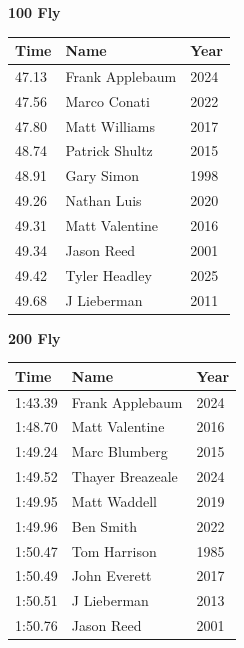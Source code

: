 \vspace{1.2em}
\noindent\begin{minipage}[t]{0.48\textwidth}
\centering
\textbf{\textcolor{teamprimary}{100 Fly}}\par
\vspace{0.5em}
\centering
\small
\renewcommand{\arraystretch}{1.0}
\setlength{\tabcolsep}{4pt}
\begin{tabular}{@{}p{1.8cm}p{3.0cm}p{1.0cm}@{}}
\toprule
\textbf{Time} & \textbf{Name} & \textbf{Year} \\
\midrule
47.13 & Frank Applebaum & 2024 \\
47.56 & Marco Conati & 2022 \\
47.80 & Matt Williams & 2017 \\
48.74 & Patrick Shultz & 2015 \\
48.91 & Gary Simon & 1998 \\
49.26 & Nathan Luis & 2020 \\
49.31 & Matt Valentine & 2016 \\
49.34 & Jason Reed & 2001 \\
49.42 & Tyler Headley & 2025 \\
49.68 & J Lieberman & 2011 \\
\bottomrule
\end{tabular}
\end{minipage}
\hfill
\begin{minipage}[t]{0.48\textwidth}
\centering
\textbf{\textcolor{teamprimary}{200 Fly}}\par
\vspace{0.5em}
\centering
\small
\renewcommand{\arraystretch}{1.0}
\setlength{\tabcolsep}{4pt}
\begin{tabular}{@{}p{1.8cm}p{3.0cm}p{1.0cm}@{}}
\toprule
\textbf{Time} & \textbf{Name} & \textbf{Year} \\
\midrule
1:43.39 & Frank Applebaum & 2024 \\
1:48.70 & Matt Valentine & 2016 \\
1:49.24 & Marc Blumberg & 2015 \\
1:49.52 & Thayer Breazeale & 2024 \\
1:49.95 & Matt Waddell & 2019 \\
1:49.96 & Ben Smith & 2022 \\
1:50.47 & Tom Harrison & 1985 \\
1:50.49 & John Everett & 2017 \\
1:50.51 & J Lieberman & 2013 \\
1:50.76 & Jason Reed & 2001 \\
\bottomrule
\end{tabular}
\end{minipage}
